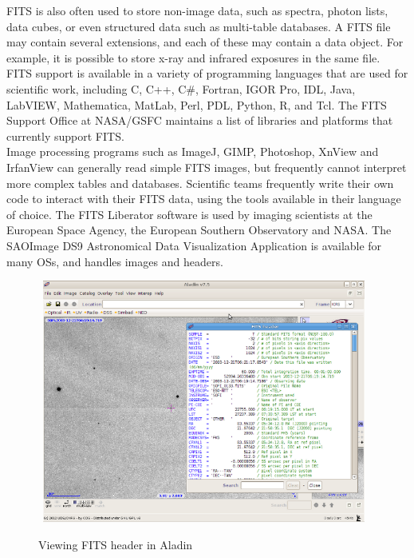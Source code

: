 FITS is also often used to store non-image data, such as spectra, photon lists, data cubes, or even structured data such as multi-table databases. A FITS file may contain several extensions, and each of these may contain a data object. For example, it is possible to store x-ray and infrared exposures in the same file.\\
 
FITS support is available in a variety of programming languages that are used for scientific work, including C, C++, C\#, Fortran, IGOR Pro, IDL, Java, LabVIEW, Mathematica, MatLab, Perl, PDL, Python, R, and Tcl. The FITS Support Office at NASA/GSFC maintains a list of libraries and platforms that currently support FITS.\\
 
Image processing programs such as ImageJ, GIMP, Photoshop, XnView and IrfanView can generally read simple FITS images, but frequently cannot interpret more complex tables and databases. Scientific teams frequently write their own code to interact with their FITS data, using the tools available in their language of choice. The FITS Liberator software is used by imaging scientists at the European Space Agency, the European Southern Observatory and NASA. The SAOImage DS9 Astronomical Data Visualization Application is available for many OSs, and handles images and headers.\\


\begin{figure}
\centering
\includegraphics[width=11cm,height=8cm]{images/fits_header.png}\\
\caption{Viewing FITS header in Aladin}
\end{figure}

